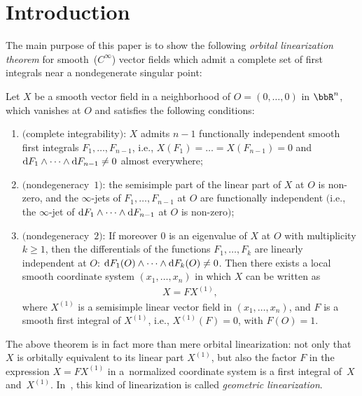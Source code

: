 \section{Introduction}

The main purpose of this paper is to show the following \emph{orbital linearization theorem} for smooth~($C^\infty$)
vector f\/ields which admit a complete set of f\/irst integrals near a nondegenerate singular point:

\begin{thm} \label{thm:SmoothLinearization}
Let $X$ be a smooth vector field in a neighborhood of $O = (0,\dots,0)$ in $\bbR^n$,
which vanishes at $O$ and satisfies the following conditions:
\begin{enumerate}\itemsep=0pt
\item[$i)$] $($complete integrability$)$: $X$ admits $n-1$ functionally independent smooth first integrals $F_1,\dots, F_{n-1}$,
i.e., $X(F_1) = \dots = X(F_{n-1}) = 0$ and ${\rm d}F_1 \wedge \dots \wedge {\rm d}F_{n-1} \neq 0$ almost everywhere;
\item[$ii)$] $($nondegeneracy~$1)$: the semisimple part of the linear part of $X$ at $O$ is non-zero, and the $\infty$-jets
of $F_1,\dots,F_{n-1}$ at $O$ are functionally independent $($i.e.,
the $\infty$-jet of ${\rm d}F_1 \wedge \dots \wedge {\rm d}F_{n-1}$ at $O$ is non-zero$)$;
\item[$iii)$] $($nondegeneracy~$2)$: If moreover $0$ is an eigenvalue of $X$ at $O$ with multiplicity $k \geq 1$,
then the differentials of the functions $F_1,\dots, F_k$ are linearly independent at $O$:
 ${\rm d}F_1(O) \wedge \dots \wedge {\rm d}F_k(O) \neq 0$. Then there exists a local smooth coordinate system $(x_1,\dots,x_n)$ in which $X$ can be written as
\begin{gather*}
X = F X^{(1)},
\end{gather*}
where $X^{(1)}$ is a semisimple linear vector field in $(x_1,\dots,x_n)$, and $F$ is a smooth first integral of $X^{(1)}$, i.e., $X^{(1)}(F) = 0$, with $F(O)=1$.
\end{enumerate}
\end{thm}

The above theorem is in fact more than mere orbital linearization: not only that $X$ is orbitally equivalent to its linear part
$X^{(1)}$, but also the factor $F$ in the expression $X = FX^{(1)}$ in a~normalized coordinate system is a
f\/irst integral of~$X$ and~$X^{(1)}$. In~\cite{Zung-Nondegenerate2015}, this kind of linearization is called
\textit{geometric linearization}.

